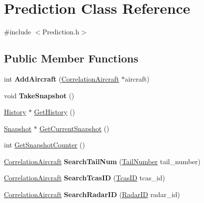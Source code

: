 \hypertarget{class_prediction}{}\section{Prediction Class Reference}
\label{class_prediction}


{\ttfamily \#include $<$Prediction.\+h$>$}

\subsection*{Public Member Functions}
\begin{DoxyCompactItemize}
\item 
\hypertarget{class_prediction_a61a8877c7d4e1479db3ca3f6d40ffa98}{}int {\bfseries Add\+Aircraft} (\hyperlink{class_correlation_aircraft}{Correlation\+Aircraft} $\ast$aircraft)\label{class_prediction_a61a8877c7d4e1479db3ca3f6d40ffa98}

\item 
\hypertarget{class_prediction_a063a40cd2d825626293e4face2ba1af4}{}void {\bfseries Take\+Snapshot} ()\label{class_prediction_a063a40cd2d825626293e4face2ba1af4}

\item 
\hyperlink{class_history}{History} $\ast$ \hyperlink{class_prediction_a95b2ec6b3c313663c14e651a8517bf41}{Get\+History} ()
\item 
\hyperlink{class_snapshot}{Snapshot} $\ast$ \hyperlink{class_prediction_a9e6b65c67fc5fed8a1e8e7564b3e8281}{Get\+Current\+Snapshot} ()
\item 
int \hyperlink{class_prediction_a5503facfc667ccc43a52d5f3565f7b2f}{Get\+Snapshot\+Counter} ()
\item 
\hypertarget{class_prediction_a9fbe1f6ba8758d52dfd859430fd1c771}{}\hyperlink{class_correlation_aircraft}{Correlation\+Aircraft} {\bfseries Search\+Tail\+Num} (\hyperlink{class_tail_number}{Tail\+Number} tail\+\_\+number)\label{class_prediction_a9fbe1f6ba8758d52dfd859430fd1c771}

\item 
\hypertarget{class_prediction_a93d74fac1cebc29dfed7b5e1a2656f9f}{}\hyperlink{class_correlation_aircraft}{Correlation\+Aircraft} {\bfseries Search\+Tcas\+I\+D} (\hyperlink{class_tcas_i_d}{Tcas\+I\+D} tcas\+\_\+id)\label{class_prediction_a93d74fac1cebc29dfed7b5e1a2656f9f}

\item 
\hypertarget{class_prediction_a816602d10698f98246e33502c072b81b}{}\hyperlink{class_correlation_aircraft}{Correlation\+Aircraft} {\bfseries Search\+Radar\+I\+D} (\hyperlink{class_radar_i_d}{Radar\+I\+D} radar\+\_\+id)\label{class_prediction_a816602d10698f98246e33502c072b81b}


\end{DoxyCompactItemize}
